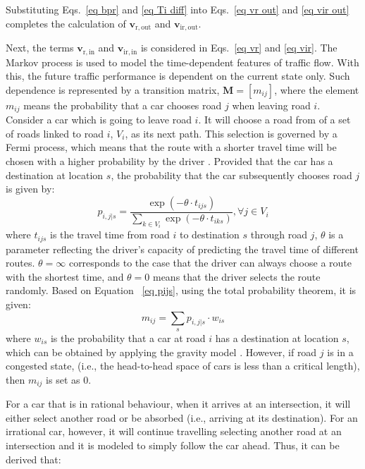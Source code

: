 \documentclass[review,11pt,nonatbib]{elsarticle}
\begin{document}
Substituting Eqs.~\eqref{eq bpr} and \eqref{eq Ti diff} into Eqs.~\eqref{eq vr out} and \eqref{eq vir out} completes the calculation of $\mathbf{v}_{\mathrm{r,out}}$ and $\mathbf{v}_{\mathrm{ir,out}}$.
\par Next, the terms $\mathbf{v}_{\mathrm{r,in}}$ and $\mathbf{v}_{\mathrm{ir,in}}$ is considered in Eqs.~\eqref{eq vr} and \eqref{eq vir}. The Markov process is used to model the time-dependent features of traffic flow. With this, the future traffic performance is dependent on the current state only. Such dependence is represented by a transition matrix, $\mathbf{M}=[m_{ij}]$, where the element $m_{ij}$ means the probability that a car chooses road $j$ when leaving road $i$.  Consider a car which is going to leave road $i$. It will choose a road from of a set of roads linked to road $i$, $V_i$, as its next path. This selection is governed by a Fermi process, which means that the route with a shorter travel time will be chosen with a higher probability by the driver \citep{lam1999stochastic,wu2010universality}. Provided that the car has a destination at location $s$, the probability that the car subsequently chooses road $j$ is given by:
\begin{equation}\label{eq pijs}
p_{i,j|s}=\frac{\exp(-\theta \cdot t_{ijs})}{\sum_{k\in V_i}\exp(-\theta\cdot t_{iks})}, \forall j\in V_i
\end{equation}
where $t_{ijs}$ is the travel time from road $i$ to destination $s$ through road $j$, $\theta$ is a parameter reflecting the driver's capacity of predicting the travel time of different routes. $\theta=\infty$ corresponds to the case that the driver can always choose a route with the shortest time, and $\theta=0$ means that the driver selects the route randomly. Based on Equation ~\eqref{eq pijs}, using the total probability theorem, it is given:
\begin{equation}\label{eq mij}
m_{ij}=\sum_{s} p_{i,j|s}\cdot w_{is}
\end{equation}
where $w_{is}$ is the probability that a car at road $i$ has a destination at location $s$, which can be obtained by applying the gravity model \citep{moriarty2007modeling,chang2012post}. However, if road $j$ is in a congested state, (i.e., the head-to-head space of cars is less than a critical length), then $m_{ij}$ is set as 0.
\par For a car that is in rational behaviour, when it arrives at an intersection, it will either select another road or be absorbed (i.e., arriving at its destination). For an irrational car, however, it will continue travelling selecting another road at an intersection and it is modeled to simply follow the car ahead. Thus, it can be derived that:
\end{document}
